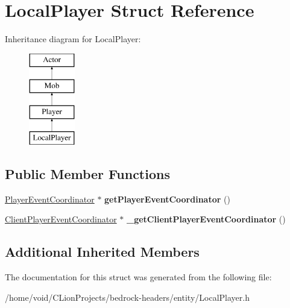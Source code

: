 \hypertarget{struct_local_player}{}\section{Local\+Player Struct Reference}
\label{struct_local_player}
Inheritance diagram for Local\+Player\+:\begin{figure}[H]
\begin{center}
\leavevmode
\includegraphics[height=4.000000cm]{struct_local_player}
\end{center}
\end{figure}
\subsection*{Public Member Functions}
\begin{DoxyCompactItemize}
\item 
\mbox{\label{struct_local_player_a2d7d7a2333a90c516d0e5f857db94c2b}} 
\mbox{\hyperlink{struct_player_event_coordinator}{Player\+Event\+Coordinator}} $\ast$ {\bfseries get\+Player\+Event\+Coordinator} ()
\item 
\mbox{\label{struct_local_player_afdf216808992191c67170cc4946206e6}} 
\mbox{\hyperlink{struct_client_player_event_coordinator}{Client\+Player\+Event\+Coordinator}} $\ast$ {\bfseries \+\_\+get\+Client\+Player\+Event\+Coordinator} ()
\end{DoxyCompactItemize}
\subsection*{Additional Inherited Members}


The documentation for this struct was generated from the following file\+:\begin{DoxyCompactItemize}
\item 
/home/void/\+C\+Lion\+Projects/bedrock-\/headers/entity/Local\+Player.\+h\end{DoxyCompactItemize}
